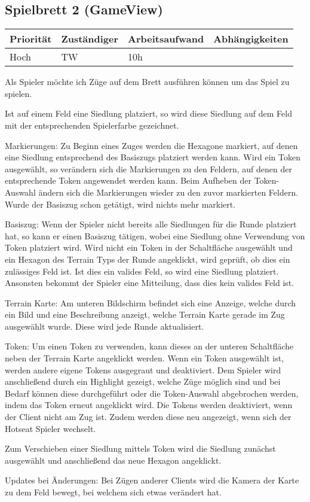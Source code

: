 \documentclass[a4paper]{scrreprt}
\newenvironment{requirement}[5] {
	\subsection{#1}
	\begin{tabularx}{\textwidth}{|X|l|X|X|}
		\hline
		Priorität & Zuständiger & Arbeitsaufwand & Abhängigkeiten \\
		\hline
		#2 & #3 & #4 & #5 \\
		\hline
	\end{tabularx}
	}{
	\newpage
	}
\begin{document}
\begin{requirement}{Spielbrett 2 (GameView)}{Hoch}{TW}{10h}{}

\begin{center}
	Als Spieler möchte ich Züge auf dem Brett ausführen können um das Spiel zu spielen.
\end{center}

Ist auf einem Feld eine Siedlung platziert, so wird diese Siedlung auf dem Feld mit der entsprechenden Spielerfarbe gezeichnet. 

Markierungen:
Zu Beginn eines Zuges werden die Hexagone markiert, auf denen eine Siedlung entsprechend des Basiszugs platziert werden kann. Wird ein Token ausgewählt, so verändern sich die Markierungen zu den Feldern, auf denen der entsprechende Token angewendet werden kann. Beim Aufheben der Token-Auswahl ändern sich die Markierungen wieder zu den zuvor markierten Feldern. Wurde der Basiszug schon getätigt, wird nichts mehr markiert.

Basiszug:
Wenn der Spieler nicht bereits alle Siedlungen für die Runde platziert hat, so kann er einen Basiszug tätigen, wobei eine Siedlung ohne Verwendung von Token platziert wird.
Wird nicht ein Token in der Schaltfläche ausgewählt und ein Hexagon des Terrain Typs der Runde angeklickt, wird geprüft, ob dies ein zulässiges Feld ist. Ist dies ein valides Feld, so wird eine Siedlung platziert. Ansonsten bekommt der Spieler eine Mitteilung, dass dies kein valides Feld ist.

Terrain Karte:
Am unteren Bildschirm befindet sich eine Anzeige, welche durch ein Bild und eine Beschreibung anzeigt, welche Terrain Karte gerade im Zug ausgewählt wurde. Diese wird jede Runde aktualisiert.

Token:
Um einen Token zu verwenden, kann dieses an der unteren Schaltfläche neben der Terrain Karte angeklickt werden. Wenn ein Token ausgewählt ist, werden andere eigene Tokens ausgegraut und deaktiviert. Dem Spieler wird anschließend durch ein Highlight gezeigt, welche Züge möglich sind und bei Bedarf können diese durchgeführt oder die Token-Auswahl abgebrochen werden, indem das Token erneut angeklickt wird.
Die Tokens werden deaktiviert, wenn der Client nicht am Zug ist. Zudem werden diese neu angezeigt, wenn sich der Hotseat Spieler wechselt.

Zum Verschieben einer Siedlung mittels Token wird die Siedlung zunächst ausgewählt und anschließend das neue Hexagon angeklickt.

Updates bei Änderungen:
Bei Zügen anderer Clients wird die Kamera der Karte zu dem Feld bewegt, bei welchem sich etwas verändert hat.


\end{requirement}
\end{document}

